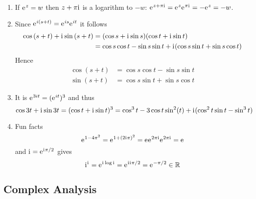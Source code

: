 \begin{exercise}\hfill
    \begin{enumerate}
        \item If \( \eu^z = w \) then \( z + \pi\iu \) is a logarithm to \( -w \):
			\( \eu^{z + \pi\iu} = \eu^{z}\eu^{\pi\iu} = - \eu^{z} = -w \).
		\item Since \( \eu^{i(s + t)} = \eu^{is} \eu^{it} \) it follows
			\[
				\begin{split}
					\cos{(s + t)} + \iu \sin{(s + t)} 
						& = (\cos{s} + \iu\sin{s})(\cos{t} + \iu\sin{t}) \\
						& = \cos{s}\cos{t} - \sin{s}\sin{t} + \iu(\cos{s}\sin{t} + \sin{s}\cos{t})
				\end{split}
			\]
			Hence
			\[
				\begin{split}
					\cos{(s + t)} & = \cos{s}\cos{t} - \sin{s}\sin{t} \\
					\sin{(s + t)} & = \cos{s}\sin{t} + \sin{s}\cos{t}
				\end{split}
			\]
		\item It is \( \eu^{3it} = (\eu^{it})^3 \) and thus
			\[
				\cos{3t} + \iu \sin{3t} 
					= (\cos{t} + \iu\sin{t})^3
					= \cos^3{t} - 3\cos{t}\sin^2(t) + \iu(\cos^2{t}\sin{t} -\sin^3{t})
			\]
        \item Fun facts
			\[ 
				\eu^{1 - 4\pi^2} = \eu^{1 + (2\iu\pi)^2} = \eu \eu^{2\pi\iu}\eu^{2\pi\iu} = \eu
			\]
			and \( \iu = \eu^{\iu\pi/2} \) gives
			\[
				\iu^\iu = \eu^{\iu\log\iu} = \eu^{\iu\iu\pi/2} = \eu^{-\pi/2} \in \R
			\]
    \end{enumerate}
\end{exercise}
\bigskip


\subsection{Complex Analysis}

